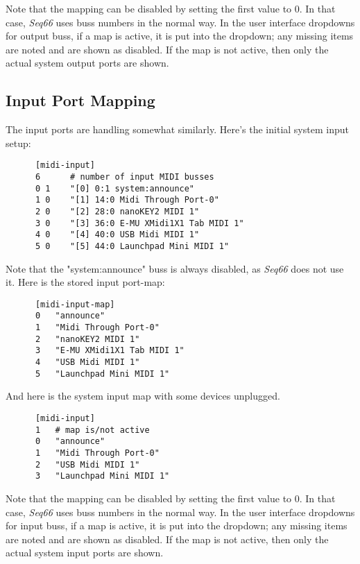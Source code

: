    Note that the mapping can be disabled by setting the first value to 0.  In
   that case, \textsl{Seq66} uses buss numbers in the normal way.
   In the user interface dropdowns for output buss, if a map is active, it is
   put into the dropdown; any missing items are noted and are shown as
   disabled.
   If the map is not active, then only the actual system output ports are shown.

\subsection{Input Port Mapping}
\label{subsec:input_port_mapping}

   The input ports are handling somewhat similarly.  Here's the initial system
   input setup:

   \begin{verbatim}
      [midi-input]
      6      # number of input MIDI busses
      0 1    "[0] 0:1 system:announce"
      1 0    "[1] 14:0 Midi Through Port-0"
      2 0    "[2] 28:0 nanoKEY2 MIDI 1"
      3 0    "[3] 36:0 E-MU XMidi1X1 Tab MIDI 1"
      4 0    "[4] 40:0 USB Midi MIDI 1"
      5 0    "[5] 44:0 Launchpad Mini MIDI 1"
   \end{verbatim}

   Note that the "system:announce" buss is always disabled, as \textsl{Seq66}
   does not use it.  Here is the stored input port-map:

   \begin{verbatim}
      [midi-input-map]
      0   "announce"
      1   "Midi Through Port-0"
      2   "nanoKEY2 MIDI 1"
      3   "E-MU XMidi1X1 Tab MIDI 1"
      4   "USB Midi MIDI 1"
      5   "Launchpad Mini MIDI 1"
   \end{verbatim}

   And here is the system input map with some devices unplugged.

   \begin{verbatim}
      [midi-input]
      1   # map is/not active
      0   "announce"
      1   "Midi Through Port-0"
      2   "USB Midi MIDI 1"
      3   "Launchpad Mini MIDI 1"
   \end{verbatim}

   Note that the mapping can be disabled by setting the first value to 0.  In
   that case, \textsl{Seq66} uses buss numbers in the normal way.
   In the user interface dropdowns for input buss, if a map is active, it is
   put into the dropdown; any missing items are noted and are shown as
   disabled.
   If the map is not active, then only the actual system input ports are shown.

